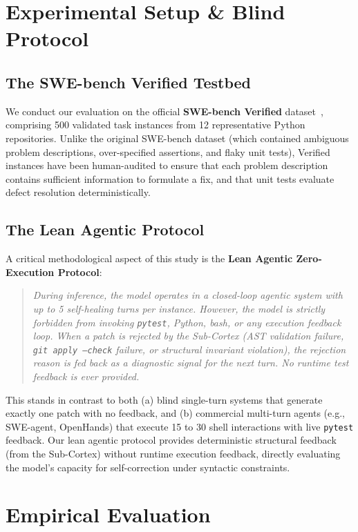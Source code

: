 \documentclass[10pt,twocolumn,letterpaper]{article}
\begin{document}
\section{Experimental Setup \& Blind Protocol}

\subsection{The SWE-bench Verified Testbed}
We conduct our evaluation on the official \textbf{SWE-bench Verified} dataset~\cite{jimenez2024swebench}, comprising 500 validated task instances from 12 representative Python repositories. Unlike the original SWE-bench dataset (which contained ambiguous problem descriptions, over-specified assertions, and flaky unit tests), Verified instances have been human-audited to ensure that each problem description contains sufficient information to formulate a fix, and that unit tests evaluate defect resolution deterministically.

\subsection{The Lean Agentic Protocol}
A critical methodological aspect of this study is the \textbf{Lean Agentic Zero-Execution Protocol}:
\begin{quote}
\textit{During inference, the model operates in a closed-loop agentic system with up to 5 self-healing turns per instance. However, the model is strictly forbidden from invoking \texttt{pytest}, Python, bash, or any execution feedback loop. When a patch is rejected by the Sub-Cortex (AST validation failure, \texttt{git apply --check} failure, or structural invariant violation), the rejection reason is fed back as a diagnostic signal for the next turn. No runtime test feedback is ever provided.}
\end{quote}

This stands in contrast to both (a) blind single-turn systems that generate exactly one patch with no feedback, and (b) commercial multi-turn agents (e.g., SWE-agent, OpenHands) that execute 15 to 30 shell interactions with live \texttt{pytest} feedback. Our lean agentic protocol provides deterministic structural feedback (from the Sub-Cortex) without runtime execution feedback, directly evaluating the model's capacity for self-correction under syntactic constraints.

\section{Empirical Evaluation}
\end{document}
